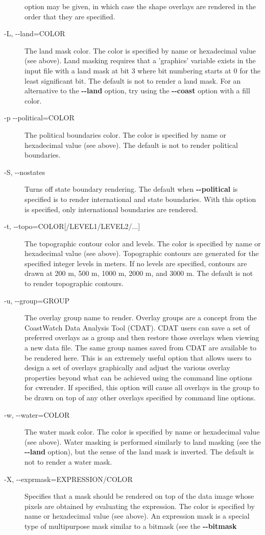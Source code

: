 \begin{description}
 option may be given, in which case the shape overlays are rendered in the order that they are specified.
\item[-L, -{-}land=COLOR]The land mask color. The color is specified by name or hexadecimal value (see above). Land masking requires that a 'graphics' variable exists in the input file with a land mask at bit 3 where bit numbering starts at 0 for the least significant bit. The default is not to render a land mask. For an alternative to the \textbf{-{-}land}
 option, try using the \textbf{-{-}coast}
 option with a fill color.
\item[-p -{-}political=COLOR]The political boundaries color. The color is specified by name or hexadecimal value (see above). The default is not to render political boundaries.
\item[-S, -{-}nostates]Turns off state boundary rendering. The default when \textbf{-{-}political}
 is specified is to render international and state boundaries. With this option is specified, only international boundaries are rendered.
\item[-t, -{-}topo=COLOR[/LEVEL1/LEVEL2/...{]}]The topographic contour color and levels. The color is specified by name or hexadecimal value (see above). Topographic contours are generated for the specified integer levels in meters. If no levels are specified, contours are drawn at 200 m, 500 m, 1000 m, 2000 m, and 3000 m. The default is not to render topographic contours.
\item[-u, -{-}group=GROUP]The overlay group name to render. Overlay groups are a concept from the CoastWatch Data Analysis Tool (CDAT). CDAT users can save a set of preferred overlays as a group and then restore those overlays when viewing a new data file. The same group names saved from CDAT are available to be rendered here. This is an extremely useful option that allows users to design a set of overlays graphically and adjust the various overlay properties beyond what can be achieved using the command line options for cwrender. If specified, this option will cause all overlays in the group to be drawn on top of any other overlays specified by command line options. 
\item[-w, -{-}water=COLOR]The water mask color. The color is specified by name or hexadecimal value (see above). Water masking is performed similarly to land masking (see the \textbf{-{-}land}
 option), but the sense of the land mask is inverted. The default is not to render a water mask.
\item[-X, -{-}exprmask=EXPRESSION/COLOR]Specifies that a mask should be rendered on top of the data image whose pixels are obtained by evaluating the expression. The color is specified by name or hexadecimal value (see above). An expression mask is a special type of multipurpose mask similar to a bitmask (see the \textbf{-{-}bitmask}

\end{description}
